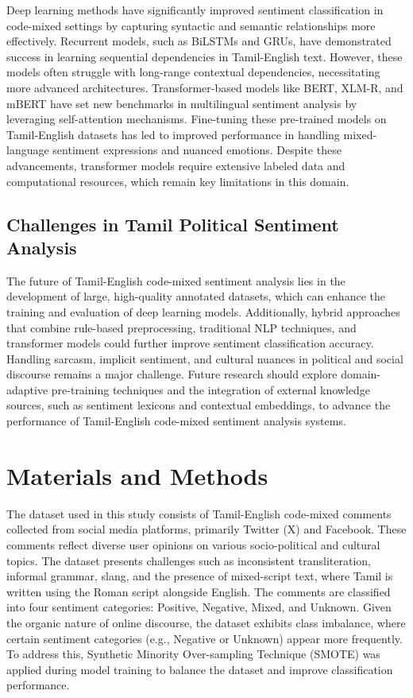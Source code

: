 \documentclass[11pt]{article}
\begin{document}
Deep learning methods have significantly improved sentiment classification in code-mixed settings by capturing syntactic and semantic relationships more effectively. Recurrent models, such as BiLSTMs and GRUs, have demonstrated success in learning sequential dependencies in Tamil-English text. However, these models often struggle with long-range contextual dependencies, necessitating more advanced architectures. Transformer-based models like BERT, XLM-R, and mBERT have set new benchmarks in multilingual sentiment analysis by leveraging self-attention mechanisms. Fine-tuning these pre-trained models on Tamil-English datasets has led to improved performance in handling mixed-language sentiment expressions and nuanced emotions. Despite these advancements, transformer models require extensive labeled data and computational resources, which remain key limitations in this domain.

\subsection{Challenges in Tamil Political Sentiment Analysis}

The future of Tamil-English code-mixed sentiment analysis lies in the development of large, high-quality annotated datasets, which can enhance the training and evaluation of deep learning models. Additionally, hybrid approaches that combine rule-based preprocessing, traditional NLP techniques, and transformer models could further improve sentiment classification accuracy. Handling sarcasm, implicit sentiment, and cultural nuances in political and social discourse remains a major challenge. Future research should explore domain-adaptive pre-training techniques and the integration of external knowledge sources, such as sentiment lexicons and contextual embeddings, to advance the performance of Tamil-English code-mixed sentiment analysis systems.


\section{ Materials and Methods}
The dataset used in this study consists of Tamil-English code-mixed comments collected from social media platforms, primarily Twitter (X) and Facebook. These comments reflect diverse user opinions on various socio-political and cultural topics. The dataset presents challenges such as inconsistent transliteration, informal grammar, slang, and the presence of mixed-script text, where Tamil is written using the Roman script alongside English. The comments are classified into four sentiment categories: Positive, Negative, Mixed, and Unknown. Given the organic nature of online discourse, the dataset exhibits class imbalance, where certain sentiment categories (e.g., Negative or Unknown) appear more frequently. To address this, Synthetic Minority Over-sampling Technique (SMOTE) was applied during model training to balance the dataset and improve classification performance.
\end{document}
